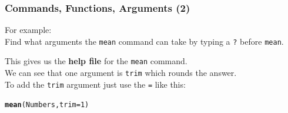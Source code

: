 \documentclass{beamer}\usepackage{graphicx, color}
\makeatletter
\newcommand{\hlfunctioncall}[1]{\textcolor[rgb]{0.501960784313725,0,0.329411764705882}{\textbf{#1}}}%
\newenvironment{kframe}{%
 \def\at@end@of@kframe{}%
 \ifinner\ifhmode%
  \def\at@end@of@kframe{\end{minipage}}%
  \begin{minipage}{\columnwidth}%
 \fi\fi%
 \def\FrameCommand##1{\hskip\@totalleftmargin \hskip-\fboxsep
 \colorbox{shadecolor}{##1}\hskip-\fboxsep
     \hskip-\linewidth \hskip-\@totalleftmargin \hskip\columnwidth}%
 \MakeFramed {\advance\hsize-\width
   \@totalleftmargin\z@ \linewidth\hsize
   \@setminipage}}%
 {\par\unskip\endMakeFramed%
 \at@end@of@kframe}
\makeatother
\begin{document}

\begin{frame}[fragile]
  \frametitle{Commands, Functions, Arguments (2)}
  {\LARGE{For example:}} \\[0.5cm]
  Find what arguments the {\tt{mean}} command can take by typing a {\tt{?}} before {\tt{mean}}.

  This gives us the {\bf{help file}} for the {\tt{mean}} command. \\[0.25cm]

  We can see that one argument is {\tt{trim}} which rounds the answer. \\ [0.25cm]

  To add the {\tt{trim}} argument just use the {\tt{=}} like this:

\begin{kframe}
\begin{alltt}
\hlfunctioncall{mean}(Numbers, trim = 1)
\end{alltt}
\end{kframe}
[1] 3.5



\end{frame}

\end{document}

